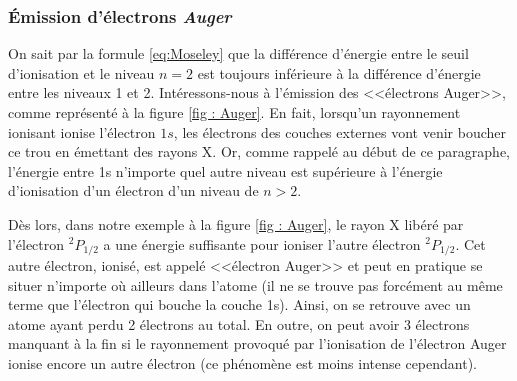 \subsubsection{Émission d'électrons \emph{Auger}}



On sait par la formule \ref{eq:Moseley} que la différence d'énergie entre le seuil d'ionisation et le niveau $n = 2$ est toujours inférieure à la différence d'énergie entre les niveaux 1 et 2. Intéressons-nous à l'émission des <<électrons Auger>>, comme représenté à la figure \ref{fig : Auger}. En fait, lorsqu'un rayonnement ionisant ionise l'électron $1s$, les électrons des couches externes vont venir boucher ce trou en émettant des rayons X. Or, comme rappelé au début de ce paragraphe, l'énergie entre 1s n'importe quel autre niveau est supérieure à l'énergie d'ionisation d'un électron d'un niveau de $n>2$.

Dès lors, dans notre exemple à la figure \ref{fig : Auger}, le rayon X libéré par l'électron $^2P_{1/2}$ a une énergie suffisante pour ioniser l'autre électron $^2P_{1/2}$. Cet autre électron, ionisé, est appelé <<électron Auger>> et peut en pratique se situer n'importe où ailleurs dans l'atome (il ne se trouve pas forcément au même terme que l'électron qui bouche la couche 1s). Ainsi, on se retrouve avec un atome ayant perdu 2 électrons au total. En outre, on peut avoir 3 électrons manquant à la fin si le rayonnement provoqué par l'ionisation de l'électron Auger ionise encore un autre électron (ce phénomène est moins intense cependant).

